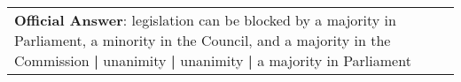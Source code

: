 \begin{figure*}[ht]
{\begin{tabular}{p{}}
            \textbf{Official Answer}: legislation can be blocked by a majority in Parliament, a minority in the Council, and a majority in the Commission \textbf{|} unanimity \textbf{|} unanimity \textbf{|} a majority in Parliament                                                                                                                                                                                                                                                                                                                                                                                                                                                                                                                                                                                                                                                                                                                                                                                                                                                                                                                                                                                                                                                                                                                                                                                                                                                                                                                                                                                                                                                                                                                                \\

\end{tabular}}
\end{figure*}
